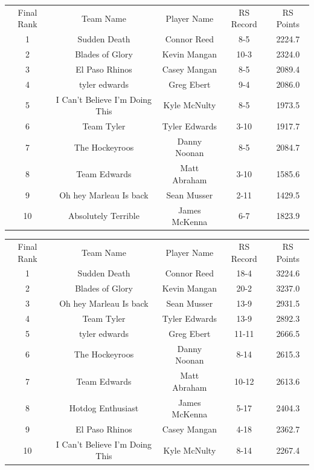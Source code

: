\documentclass[11pt,letterpaper]{article}
\begin{document}
\newpage
{}
\vspace{-25pt}
\begin{table} [h]
\begin{center}
\begin{tabular} { c c c c c }
\\ Final Rank & Team Name & Player Name & RS Record & RS Points
\\ 1 & Sudden Death & Connor Reed & 8-5 & 2224.7
\\ 2 & Blades of Glory & Kevin Mangan & 10-3 & 2324.0
\\ 3 & El Paso Rhinos & Casey Mangan & 8-5 & 2089.4
\\ 4 & tyler edwards & Greg Ebert & 9-4 & 2086.0
\\ 5 & I Can't Believe I'm Doing This & Kyle McNulty & 8-5 & 1973.5
\\ 6 & Team Tyler & Tyler Edwards & 3-10 & 1917.7
\\ 7 & The Hockeyroos & Danny Noonan & 8-5 & 2084.7
\\ 8 & Team Edwards & Matt Abraham & 3-10 & 1585.6
\\ 9 & Oh hey Marleau Is back & Sean Musser  & 2-11 & 1429.5
\\ 10 & Absolutely Terrible & James McKenna & 6-7 & 1823.9
\end{tabular}
\end{center}
\end{table}

\vspace{-25pt}
\begin{table} [h]
\begin{center}
\begin{tabular} { c c c c c }
\\ Final Rank & Team Name & Player Name & RS Record & RS Points
\\ 1 & Sudden Death & Connor Reed & 18-4 & 3224.6
\\ 2 & Blades of Glory & Kevin Mangan & 20-2 & 3237.0
\\ 3 & Oh hey Marleau Is back & Sean Musser & 13-9 & 2931.5
\\ 4 & Team Tyler & Tyler Edwards & 13-9 & 2892.3
\\ 5 & tyler edwards & Greg Ebert & 11-11 & 2666.5
\\ 6 & The Hockeyroos & Danny Noonan & 8-14 & 2615.3
\\ 7 & Team Edwards & Matt Abraham & 10-12 & 2613.6
\\ 8 & Hotdog Enthusiast & James McKenna & 5-17 & 2404.3
\\ 9 & El Paso Rhinos & Casey Mangan & 4-18 & 2362.7
\\ 10 & I Can't Believe I'm Doing This & Kyle McNulty & 8-14 & 2267.4
\end{tabular}
\end{center}
\end{table}
\end{document}
